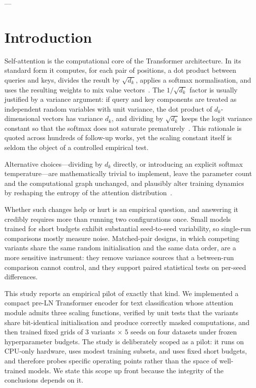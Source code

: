 \documentclass[10pt,a4paper]{article}
\begin{document}
---

\section{Introduction}

Self-attention is the computational core of the Transformer architecture. In its standard form it computes, for each pair of positions, a dot product between queries and keys, divides the result by $\sqrt{d_k}$, applies a softmax normalisation, and uses the resulting weights to mix value vectors~\cite{vaswani2017}. The $1/\sqrt{d_k}$ factor is usually justified by a variance argument: if query and key components are treated as independent random variables with unit variance, the dot product of $d_k$-dimensional vectors has variance $d_k$, and dividing by $\sqrt{d_k}$ keeps the logit variance constant so that the softmax does not saturate prematurely~\cite{vaswani2017}. This rationale is quoted across hundreds of follow-up works, yet the scaling constant itself is seldom the object of a controlled empirical test.

Alternative choices---dividing by $d_k$ directly, or introducing an explicit softmax temperature---are mathematically trivial to implement, leave the parameter count and the computational graph unchanged, and plausibly alter training dynamics by reshaping the entropy of the attention distribution~\cite{dong2021,zhai2023,hinton2015}.

Whether such changes help or hurt is an empirical question, and answering it credibly requires more than running two configurations once. Small models trained for short budgets exhibit substantial seed-to-seed variability, so single-run comparisons mostly measure noise. Matched-pair designs, in which competing variants share the same random initialisation and the same data order, are a more sensitive instrument: they remove variance sources that a between-run comparison cannot control, and they support paired statistical tests on per-seed differences.

This study reports an empirical pilot of exactly that kind. We implemented a compact pre-LN Transformer encoder for text classification whose attention module admits three scaling functions, verified by unit tests that the variants share bit-identical initialisation and produce correctly masked computations, and then trained fixed grids of $3$ variants $\times$ 5 seeds on four datasets under frozen hyperparameter budgets. The study is deliberately scoped as a pilot: it runs on CPU-only hardware, uses modest training subsets, and uses fixed short budgets, and therefore probes specific operating points rather than the space of well-trained models. We state this scope up front because the integrity of the conclusions depends on it.
\end{document}
